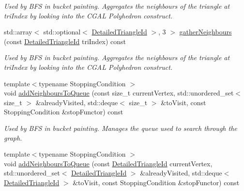 \begin{DoxyCompactItemize}
\begin{DoxyCompactList}\small\item\em Used by B\+FS in bucket painting. Aggregates the neighbours of the triangle at tri\+Index by looking into the C\+G\+AL Polyhedron construct. \end{DoxyCompactList}\item 
\mbox{\label{classpepr3d_1_1_geometry_a1638b74697c69d6dfb5125092130a9a0}} 
std\+::array$<$ std\+::optional$<$ \mbox{\hyperlink{structpepr3d_1_1_detailed_triangle_id}{Detailed\+Triangle\+Id}} $>$, 3 $>$ \mbox{\hyperlink{classpepr3d_1_1_geometry_a1638b74697c69d6dfb5125092130a9a0}{gather\+Neighbours}} (const \mbox{\hyperlink{structpepr3d_1_1_detailed_triangle_id}{Detailed\+Triangle\+Id}} tri\+Index) const
\begin{DoxyCompactList}\small\item\em Used by B\+FS in bucket painting. Aggregates the neighbours of the triangle at tri\+Index by looking into the C\+G\+AL Polyhedron construct. \end{DoxyCompactList}\item 
\mbox{\label{classpepr3d_1_1_geometry_ae361aadf7f7b305ec57f7d0c3f5ec076}} 
{\footnotesize template$<$typename Stopping\+Condition $>$ }\\void \mbox{\hyperlink{classpepr3d_1_1_geometry_ae361aadf7f7b305ec57f7d0c3f5ec076}{add\+Neighbours\+To\+Queue}} (const size\+\_\+t current\+Vertex, std\+::unordered\+\_\+set$<$ size\+\_\+t $>$ \&already\+Visited, std\+::deque$<$ size\+\_\+t $>$ \&to\+Visit, const Stopping\+Condition \&stop\+Functor) const
\begin{DoxyCompactList}\small\item\em Used by B\+FS in bucket painting. Manages the queue used to search through the graph. \end{DoxyCompactList}\item 
\mbox{\label{classpepr3d_1_1_geometry_a598ec7cc38c6849908d97fb1ee482db5}} 
{\footnotesize template$<$typename Stopping\+Condition $>$ }\\void \mbox{\hyperlink{classpepr3d_1_1_geometry_a598ec7cc38c6849908d97fb1ee482db5}{add\+Neighbours\+To\+Queue}} (const \mbox{\hyperlink{structpepr3d_1_1_detailed_triangle_id}{Detailed\+Triangle\+Id}} current\+Vertex, std\+::unordered\+\_\+set$<$ \mbox{\hyperlink{structpepr3d_1_1_detailed_triangle_id}{Detailed\+Triangle\+Id}} $>$ \&already\+Visited, std\+::deque$<$ \mbox{\hyperlink{structpepr3d_1_1_detailed_triangle_id}{Detailed\+Triangle\+Id}} $>$ \&to\+Visit, const Stopping\+Condition \&stop\+Functor) const

\end{DoxyCompactItemize}

